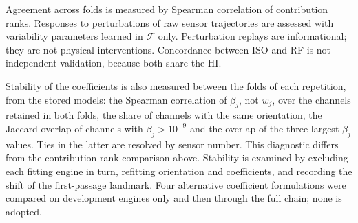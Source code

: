 \documentclass[preprint,12pt]{elsarticle}
\begin{document}
Agreement across folds is measured by Spearman correlation of contribution ranks. Responses to perturbations of raw sensor trajectories are assessed with variability parameters learned in $\mathcal F$ only. Perturbation replays are informational; they are not physical interventions. Concordance between ISO and RF is not independent validation, because both share the HI.

Stability of the coefficients is also measured between the folds of each repetition, from the stored models: the Spearman correlation of $\beta_j$, not $w_j$, over the channels retained in both folds, the share of channels with the same orientation, the Jaccard overlap of channels with $\beta_j>10^{-9}$ and the overlap of the three largest $\beta_j$ values. Ties in the latter are resolved by sensor number. This diagnostic differs from the contribution-rank comparison above. Stability is examined by excluding each fitting engine in turn, refitting orientation and coefficients, and recording the shift of the first-passage landmark. Four alternative coefficient formulations were compared on development engines only and then through the full chain; none is adopted.
\end{document}
